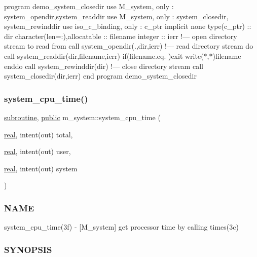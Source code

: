program demo\+\_\+system\+\_\+closedir use M\+\_\+system, only \+: system\+\_\+opendir,system\+\_\+readdir use M\+\_\+system, only \+: system\+\_\+closedir, system\+\_\+rewinddir use iso\+\_\+c\+\_\+binding, only \+: c\+\_\+ptr implicit none type(c\+\_\+ptr) \+:\+: dir character(len=\+:),allocatable \+:\+: filename integer \+:\+: ierr !--- open directory stream to read from call system\+\_\+opendir(\textquotesingle{}.\textquotesingle{},dir,ierr) !--- read directory stream do call system\+\_\+readdir(dir,filename,ierr) if(filename.\+eq.\textquotesingle{} \textquotesingle{})exit write($\ast$,$\ast$)filename enddo call system\+\_\+rewinddir(dir) !--- close directory stream call system\+\_\+closedir(dir,ierr) end program demo\+\_\+system\+\_\+closedir \mbox{\label{namespacem__system_a257d2b8987db850bc686507f19ccbe4a}} 
\subsubsection{\texorpdfstring{system\+\_\+cpu\+\_\+time()}{system\_cpu\_time()}}
{\footnotesize\ttfamily \hyperlink{M__stopwatch_83_8txt_acfbcff50169d691ff02d4a123ed70482}{subroutine}, \hyperlink{M__stopwatch_83_8txt_a2f74811300c361e53b430611a7d1769f}{public} m\+\_\+system\+::system\+\_\+cpu\+\_\+time (\begin{DoxyParamCaption}\item[{\hyperlink{read__watch_83_8txt_abdb62bde002f38ef75f810d3a905a823}{real}, intent(out)}]{total,  }\item[{\hyperlink{read__watch_83_8txt_abdb62bde002f38ef75f810d3a905a823}{real}, intent(out)}]{user,  }\item[{\hyperlink{read__watch_83_8txt_abdb62bde002f38ef75f810d3a905a823}{real}, intent(out)}]{system }\end{DoxyParamCaption})}



\subsubsection*{N\+A\+ME}

system\+\_\+cpu\+\_\+time(3f) -\/ \mbox{[}M\+\_\+system\mbox{]} get processor time by calling times(3c) 

\subsubsection*{S\+Y\+N\+O\+P\+S\+IS}

